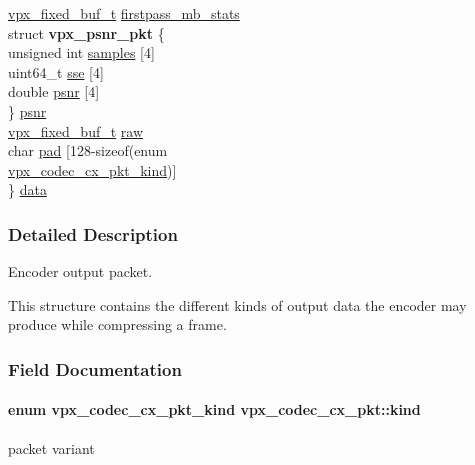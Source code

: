 \begin{DoxyCompactItemize}
\begin{tabbing}
\>\hyperlink{group__encoder_ga21fab7dd28065f349c97165501223764}{vpx\_fixed\_buf\_t} \hyperlink{structvpx__codec__cx__pkt_a81574398a8834c03d8d6911a682429fb}{firstpass\_mb\_stats}\\
\>struct {\bfseries vpx\_psnr\_pkt} \{\\
\>\>unsigned int \hyperlink{structvpx__codec__cx__pkt_a4d3fc7eb2d19c5913c6f3f474e5cf77b}{samples} \mbox{[}4\mbox{]}\\
\>\>uint64\_t \hyperlink{structvpx__codec__cx__pkt_ad65e918d3f26743cc7a8898b88bcb397}{sse} \mbox{[}4\mbox{]}\\
\>\>double \hyperlink{structvpx__codec__cx__pkt_a63744aeceb50355d6402d55309c151b6}{psnr} \mbox{[}4\mbox{]}\\
\>\} \hyperlink{structvpx__codec__cx__pkt_ac91dc0ee23d3d939b85eb82eb5ccc042}{psnr}\\
\>\hyperlink{group__encoder_ga21fab7dd28065f349c97165501223764}{vpx\_fixed\_buf\_t} \hyperlink{structvpx__codec__cx__pkt_aaa868193733b055ea9fec923c64fbd19}{raw}\\
\>char \hyperlink{structvpx__codec__cx__pkt_a49a0ba012fdabd49bff8069dfacf6ced}{pad} \mbox{[}128-\/sizeof(enum \\
\>\>\hyperlink{group__encoder_ga28a79375279536526552af3a83d2ed72}{vpx\_codec\_cx\_pkt\_kind})\mbox{]}\\
\} \hyperlink{structvpx__codec__cx__pkt_a7f97b060a23b7e89fe5b885c0074f696}{data}\\

\end{tabbing}\end{DoxyCompactItemize}


\subsubsection{Detailed Description}
Encoder output packet. 

This structure contains the different kinds of output data the encoder may produce while compressing a frame. 

\subsubsection{Field Documentation}
\paragraph[{\texorpdfstring{kind}{kind}}]{\setlength{\rightskip}{0pt plus 5cm}enum {\bf vpx\+\_\+codec\+\_\+cx\+\_\+pkt\+\_\+kind} vpx\+\_\+codec\+\_\+cx\+\_\+pkt\+::kind}\hypertarget{structvpx__codec__cx__pkt_a41f395b39516343c1329a4a85a0084f2}{}\label{structvpx__codec__cx__pkt_a41f395b39516343c1329a4a85a0084f2}
packet variant 
